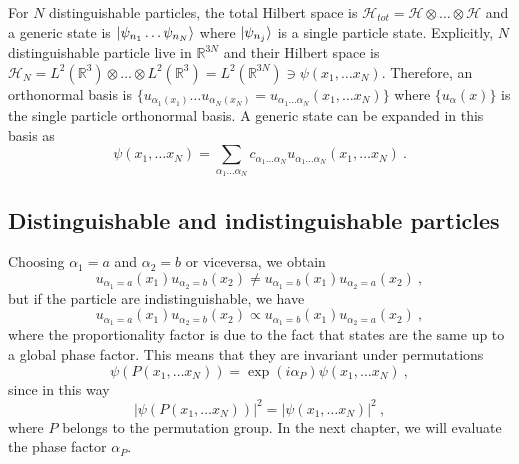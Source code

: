     For $N$ distinguishable particles, the total Hilbert space is $\mathcal H_{tot} = \mathcal H \otimes \ldots \otimes \mathcal H$ and a generic state is $\vert\psi_{n_1} \ldots \psi_{n_N}\rangle$ where $\vert\psi_{n_j}\rangle$ is a single particle state. Explicitly, $N$ distinguishable particle live in $\mathbb R^{3N}$ and their Hilbert space is $\mathcal H_N = L^2(\mathbb R^3) \otimes \ldots \otimes L^2(\mathbb R^3) = L^2 (\mathbb R^{3N}) \ni \psi(x_1, \ldots x_N)$. Therefore, an orthonormal basis is $\{u_{\alpha_1 (x_1)} \ldots u_{\alpha_N (x_N)} = u_{\alpha_1 \ldots \alpha_N} (x_1, \ldots x_N)\}$ where $\{u_\alpha (x)\}$ is the single particle orthonormal basis. A generic state can be expanded in this basis as 
    \begin{equation*}
        \psi(x_1, \ldots x_N) = \sum_{\alpha_1 \ldots \alpha_N} c_{\alpha_1 \ldots \alpha_N} u_{\alpha_1 \ldots \alpha_N} (x_1, \ldots x_N) ~.
    \end{equation*}
    
\subsection{Distinguishable and indistinguishable particles}
    
    Choosing $\alpha_1 = a$ and $\alpha_2 = b$ or viceversa, we obtain
    \begin{equation*}
        u_{\alpha_1 = a} (x_1) u_{\alpha_2 = b} (x_2) \neq u_{\alpha_1 = b} (x_1) u_{\alpha_2 = a} (x_2) ~,
    \end{equation*}
    but if the particle are indistinguishable, we have 
    \begin{equation*}
        u_{\alpha_1 = a} (x_1) u_{\alpha_2 = b} (x_2) \propto u_{\alpha_1 = b} (x_1) u_{\alpha_2 = a} (x_2) ~,
    \end{equation*}
    where the proportionality factor is due to the fact that states are the same up to a global phase factor. This means that they are invariant under permutations
    \begin{equation*}\label{perm}
        \psi(P(x_1, \ldots x_N)) = \exp(i \alpha_P) \psi (x_1, \ldots x_N) ~,
    \end{equation*}
    since in this way 
    \begin{equation*}
        |\psi(P(x_1, \ldots x_N))|^2 = |\psi(x_1, \ldots x_N)|^2 ~,
    \end{equation*}
    where $P$ belongs to the permutation group. In the next chapter, we will evaluate the phase factor $\alpha_P$.

